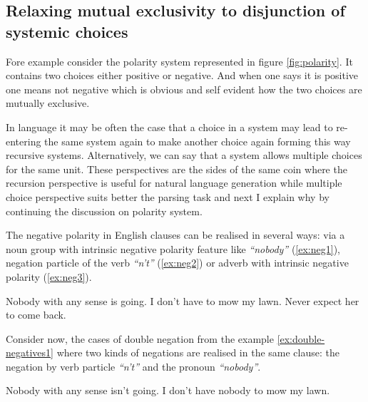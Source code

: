 \subsection{Relaxing mutual exclusivity to disjunction of systemic choices}

Fore example consider the polarity system represented in figure \ref{fig:polarity}. It contains two choices either positive or negative. And when one says it is positive one means not negative which is obvious and self evident how the two choices are mutually exclusive.


In language it may be often the case that a choice in a system may lead to re-entering the same system again to make another choice again forming this way recursive systems. Alternatively, we can say that a system allows multiple choices for the same unit. These perspectives are the sides of the same coin where the recursion perspective is useful for natural language generation while multiple choice perspective suits better the parsing task and next I explain why by continuing the discussion on polarity system. 

The negative polarity in English clauses can be realised in several ways: via a noun group with intrinsic negative polarity feature like \textit{``nobody''} (\ref{ex:neg1}), negation particle of the verb \textit{``n't''} (\ref{ex:neg2}) or adverb with intrinsic negative polarity (\ref{ex:neg3}). 

\begin{exe}
	\ex\label{ex:neg1} Nobody with any sense is going. 
	\ex\label{ex:neg2} I don't have to mow my lawn.
	\ex\label{ex:neg3} Never expect her to come back.
\end{exe}

Consider now, the cases of double negation from the example \ref{ex:double-negatives1} where two kinds of negations are realised in the same clause: the negation by verb particle \textit{``n't''} and the pronoun \textit{``nobody''}. 

\begin{exe}
	\ex \label{ex:double-negatives1}
	Nobody with any sense isn't going. 
	\ex \label{ex:double-negatives2} I don’t have nobody to mow my lawn.
\end{exe}

